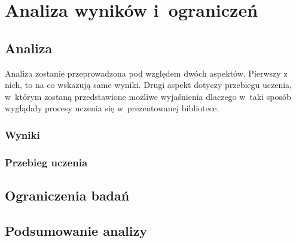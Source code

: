 \chapter{Analiza wyników i~ograniczeń}
\label{chap:result_and_restricts}

\section{Analiza}
\label{sec:analysis}
Analiza zostanie przeprowadzona pod względem dwóch aspektów.
Pierwszy z nich, to na co wskazują same wyniki.
Drugi aspekt dotyczy przebiegu uczenia,
w~którym zostaną przedstawione możliwe
wyjaśnienia dlaczego w~taki sposób wyglądały
procesy uczenia się w~prezentowanej bibliotece.

\subsection{Wyniki}
\label{subsec:result_analysis}

\subsection{Przebieg uczenia}
\label{subsec:learning_analysis}

\section{Ograniczenia badań}
\label{sec:restrictions}

\section{Podsumowanie analizy}
\label{sec:summary_analysis}
